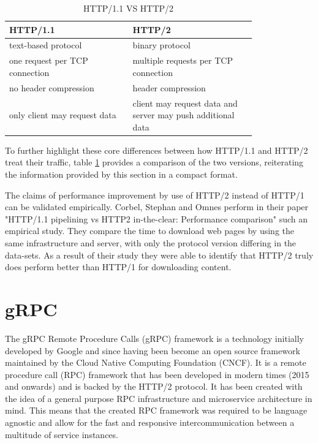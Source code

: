 \documentclass[conference]{IEEEtran}
\begin{document}
\begin{table}[!htbp]
	\centering
	\caption{HTTP/1.1 VS HTTP/2}
	\label{http2comparison}
	\begin{tabular}{| p{0.4\linewidth} | p{0.4\linewidth}|}\hline
		HTTP/1.1 & HTTP/2 \\\hline
		text-based protocol & binary protocol \\\hline
		one request per TCP connection & multiple requests per TCP connection \\\hline
		no header compression & header compression \\\hline
		only client may request data & client may request data and server may push additional data \\\hline
	\end{tabular}
\end{table}

To further highlight these core differences between how HTTP/1.1 and HTTP/2 treat their traffic, table \ref{http2comparison} provides a comparison of the two versions, reiterating the information provided by this section in a compact format.

The claims of performance improvement by use of HTTP/2 instead of HTTP/1 can be validated empirically. Corbel, Stephan and Omnes perform in their paper "HTTP/1.1 pipelining vs HTTP2 in-the-clear: Performance comparison" \cite{7745823} such an empirical study. They compare the time to download web pages by using the same infrastructure and server, with only the protocol version differing in the data-sets. As a result of their study they were able to identify that HTTP/2 truly does perform better than HTTP/1 for downloading content.

\section{gRPC}
\label{sec:grpc}

The gRPC Remote Procedure Calls (gRPC) framework \cite{GRPCAuthors2020} is a technology initially developed by Google and since having been become an open source framework maintained by the Cloud Native Computing Foundation (CNCF). It is a remote procedure call (RPC) framework that has been developed in modern times (2015 and onwards) and is backed by the HTTP/2 protocol. It has been created with the idea of a general purpose RPC infrastructure and microservice architecture in mind. This means that the created RPC framework was required to be language agnostic and allow for the fast and responsive intercommunication between a multitude of service instances. 
\end{document}
